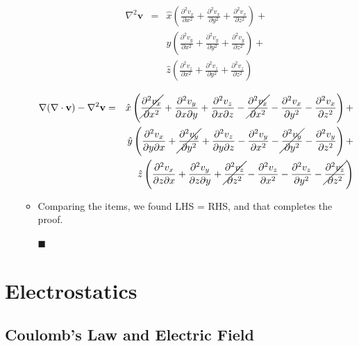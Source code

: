 \documentclass[12pt,a4paper,twoside]{article}
\begin{document}
\begin{enumerate}
\begin{itemize}
			\begin{eqnarray*}
				\nabla^2\textbf{v} &=& \hat{x}\left(\frac{\partial^2 v_x}{\partial x^2}+\frac{\partial^2 v_x}{\partial y^2}+\frac{\partial^2 v_x}{\partial z^2}\right) + \\
				& & \hat{y}\left(\frac{\partial^2 v_y}{\partial x^2}+\frac{\partial^2 v_y}{\partial y^2}+\frac{\partial^2 v_y}{\partial z^2}\right) + \\
				& & \hat{z}\left(\frac{\partial^2 v_z}{\partial x^2}+\frac{\partial^2 v_z}{\partial y^2}+\frac{\partial^2 v_z}{\partial z^2}\right)
			\end{eqnarray*}
			
			\begin{eqnarray*}
				\nabla (\nabla \cdot \textbf{v}) - \nabla^2\textbf{v} &=& 
				\hat{x}\left(\cancel{\frac{\partial^2 v_x}{\partial x^2}} + \frac{\partial^2 v_y}{\partial x\partial y} + \frac{\partial^2 v_z}{\partial x\partial z} - \cancel{\frac{\partial^2 v_x}{\partial x^2}} -\frac{\partial^2 v_x}{\partial y^2}-\frac{\partial^2 v_x}{\partial z^2} \right) +\\
				& & \hat{y}\left(\frac{\partial^2 v_x}{\partial y\partial x}+\cancel{\frac{\partial^2 v_y}{\partial y^2}}+\frac{\partial^2 v_z}{\partial y\partial z}-\frac{\partial^2 v_y}{\partial x^2}-\cancel{\frac{\partial^2 v_y}{\partial y^2}}-\frac{\partial^2 v_y}{\partial z^2} \right) +\\
				& & \hat{z}\left(\frac{\partial^2 v_x}{\partial z \partial x}+\frac{\partial^2 v_y}{\partial z\partial y} +\cancel{\frac{\partial^2 v_z}{\partial z^2}}-\frac{\partial^2 v_z}{\partial x^2}-\frac{\partial^2 v_z}{\partial y^2}-\cancel{\frac{\partial^2 v_z}{\partial z^2}} \right)
			\end{eqnarray*}
			\item Comparing the items, we found LHS = RHS, and that completes the proof.
			\begin{flushright}
				$\blacksquare$
			\end{flushright}
			
			
		\end{itemize}
	\end{enumerate}
	
\section{Electrostatics}
\subsection{Coulomb's Law and Electric Field}
\end{document}
